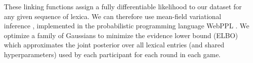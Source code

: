 \documentclass[10pt,letterpaper]{article}
\newcommand{\ndg}[1]{\textcolor{Green}{[ndg: #1]}}
\begin{document}
These linking functions assign a fully differentiable likelihood to our dataset for any given sequence of lexica. We can therefore use mean-field variational inference \cite{RanganathGerrishBlei13_BlackBoxVariationalInference}, implemented in the probabilistic programming language WebPPL \cite{GoodmanStuhlmuller14_DIPPL}. We optimize a family of Gaussians to minimize the evidence lower bound (ELBO) which approximates the joint posterior over all lexical entries (and shared hyperparameters) used by each participant for each round in each game. 

\end{document}
